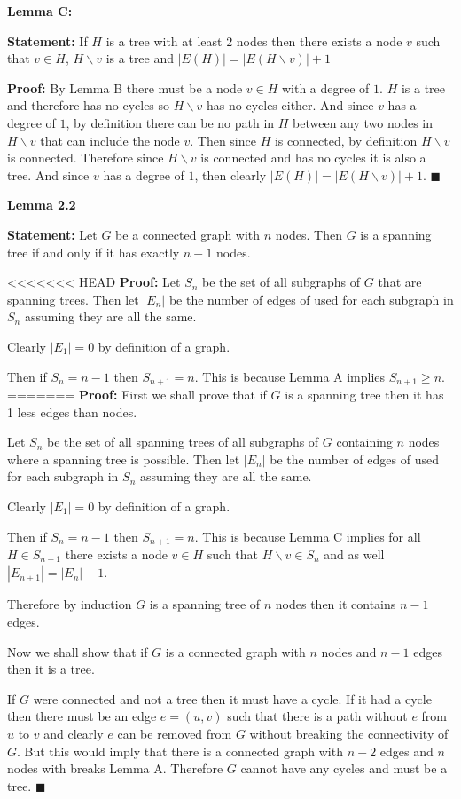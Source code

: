 \documentclass{article}
\newcommand*{\QEDA}{\hfill\ensuremath{\blacksquare}}%
\begin{document}
\textbf{Lemma C:} 

\textbf{Statement:} If $H$ is a tree with at least $2$ nodes then there exists a node $v$ such that $v \in H$, $H \backslash v$ is a tree and $|E(H)| = |E(H \backslash v)| + 1$ 

\textbf{Proof:} By Lemma B there must be a node $v \in H$ with a degree of $1$. $H$ is a tree and therefore has no cycles so $H \backslash v$ has no cycles either. And since $v$ has a degree of $1$, by definition there can be no path in $H$ between any two nodes in $H \backslash v$ that can include the node $v$. Then since $H$ is connected, by definition $H \backslash v$ is connected. Therefore since $H \backslash v$ is connected and has no cycles it is also a tree. And since $v$ has a degree of $1$, then clearly $|E(H)| = |E(H \backslash v)| + 1$. 
\QEDA
 

\textbf{Lemma 2.2}

\textbf{Statement:} Let $G$ be a connected graph with $n$ nodes. Then $G$ is a spanning tree if and only if it has exactly $n-1$ nodes.

<<<<<<< HEAD
\textbf{Proof:} Let $S_n$ be the set of all subgraphs of $G$ that are spanning trees. Then let $|E_n|$ be the number of edges of used for each subgraph in $S_n$ assuming they are all the same. 

Clearly $|E_1| = 0$ by definition of a graph.

Then if $S_n = n-1$ then $S_{n+1} = n$. 
This is because Lemma A implies $S_{n+1} \geq n$.     
=======
\textbf{Proof:} 
First we shall prove that if $G$ is a spanning tree then it has 1 less edges than nodes.

Let $S_n$ be the set of all spanning trees of all subgraphs of $G$ containing $n$ nodes where a spanning tree is possible. Then let $|E_n|$ be the number of edges of used for each subgraph in $S_n$ assuming they are all the same. 

Clearly $|E_1| = 0$ by definition of a graph.

Then if $S_n = n-1$ then $S_{n+1} = n $. 
This is because Lemma C implies for all $H \in S_{n+1}$ there exists a node $v \in H$ such that $H \backslash v \in S_{n}$ and as well $|E_{n+1}| = |E_{n}| + 1$. 

Therefore by induction $G$ is a spanning tree of $n$ nodes then it contains $n-1$ edges.

Now we shall show that if $G$ is a connected graph with $n$ nodes and $n-1$ edges then it is a tree. 

If $G$ were connected and not a tree then it must have a cycle. If it had a cycle then there must be an edge $e = (u,v)$ such that there is a path without $e$ from $u$ to $v$ and clearly $e$ can be removed from $G$ without breaking the connectivity of $G$. But this would imply that there is a connected graph with $n-2$ edges and $n$ nodes with breaks Lemma A. Therefore $G$ cannot have any cycles and must be a tree. 
\QEDA
\end{document}

